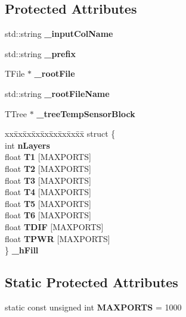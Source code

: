 \subsection*{Protected Attributes}
\begin{DoxyCompactItemize}
\item 
std::string {\bfseries \_\-inputColName}\label{classCALICE_1_1TempRootTreeGenerator_a08f763e65ab9a64986e987af8ce0117c}

\item 
std::string {\bfseries \_\-prefix}\label{classCALICE_1_1TempRootTreeGenerator_a324bde76149073163629a7e9e50c453e}

\item 
TFile $\ast$ {\bfseries \_\-rootFile}\label{classCALICE_1_1TempRootTreeGenerator_add462b67e83bd77baed72038875a81a6}

\item 
std::string {\bfseries \_\-rootFileName}\label{classCALICE_1_1TempRootTreeGenerator_a0c8aec17e8952dd62d3bfa678ce3eca3}

\item 
TTree $\ast$ {\bfseries \_\-treeTempSensorBlock}\label{classCALICE_1_1TempRootTreeGenerator_a40cc9d843dbba86306d56dbee9218c79}

\item 
\begin{tabbing}
xx\=xx\=xx\=xx\=xx\=xx\=xx\=xx\=xx\=\kill
struct \{\\
\>int {\bfseries nLayers}\\
\>float {\bfseries T1} [MAXPORTS]\\
\>float {\bfseries T2} [MAXPORTS]\\
\>float {\bfseries T3} [MAXPORTS]\\
\>float {\bfseries T4} [MAXPORTS]\\
\>float {\bfseries T5} [MAXPORTS]\\
\>float {\bfseries T6} [MAXPORTS]\\
\>float {\bfseries TDIF} [MAXPORTS]\\
\>float {\bfseries TPWR} [MAXPORTS]\\
\} {\bfseries \_hFill}\label{classCALICE_1_1TempRootTreeGenerator_ab47c17d8cd4b84b14b8912cf62281b5a}
\\

\end{tabbing}\end{DoxyCompactItemize}
\subsection*{Static Protected Attributes}
\begin{DoxyCompactItemize}
\item 
static const unsigned int {\bfseries MAXPORTS} = 1000\label{classCALICE_1_1TempRootTreeGenerator_ab2162b267c9e1f26729de736c4b2bf8d}

\end{DoxyCompactItemize}
